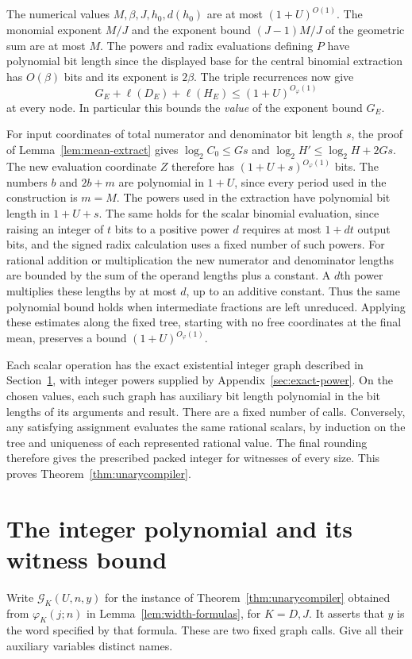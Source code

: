 \documentclass[11pt,letterpaper]{article}
\numberwithin{equation}{section}
\begin{document}
The numerical values $M,\beta,J,h_0,d(h_0)$ are at most $(1+U)^{O(1)}$. The monomial exponent $M/J$ and the exponent bound $(J-1)M/J$ of the geometric sum are at most $M$. The powers and radix evaluations defining $P$ have polynomial bit length since the displayed base for the central binomial extraction has $O(\beta)$ bits and its exponent is $2\beta$. The triple recurrences now give
\[
              G_E+\ell(D_E)+\ell(H_E)\le(1+U)^{O_\varphi(1)}
\]
at every node. In particular this bounds the \emph{value} of the exponent bound $G_E$.

For input coordinates of total numerator and denominator bit length $s$, the proof of Lemma~\ref{lem:mean-extract} gives $\log_2 C_0\le Gs$ and $\log_2 H'\le\log_2 H+2Gs$. The new evaluation coordinate $Z$ therefore has $(1+U+s)^{O_\varphi(1)}$ bits. The numbers $b$ and $2b+m$ are polynomial in $1+U$, since every period used in the construction is $m=M$. The powers used in the extraction have polynomial bit length in $1+U+s$. The same holds for the scalar binomial evaluation, since raising an integer of $t$ bits to a positive power $d$ requires at most $1+dt$ output bits, and the signed radix calculation uses a fixed number of such powers. For rational addition or multiplication the new numerator and denominator lengths are bounded by the sum of the operand lengths plus a constant. A $d$th power multiplies these lengths by at most $d$, up to an additive constant. Thus the same polynomial bound holds when intermediate fractions are left unreduced. Applying these estimates along the fixed tree, starting with no free coordinates at the final mean, preserves a bound $(1+U)^{O_\varphi(1)}$.

Each scalar operation has the exact existential integer graph described in Section~\ref{sec:arithmetic}, with integer powers supplied by Appendix~\ref{sec:exact-power}. On the chosen values, each such graph has auxiliary bit length polynomial in the bit lengths of its arguments and result. There are a fixed number of calls. Conversely, any satisfying assignment evaluates the same rational scalars, by induction on the tree and uniqueness of each represented rational value. The final rounding therefore gives the prescribed packed integer for witnesses of every size. This proves Theorem~\ref{thm:unarycompiler}.

\section{The integer polynomial and its witness bound}\label{sec:arithmetic}
Write $\mathcal G_K(U,n,y)$ for the instance of Theorem~\ref{thm:unarycompiler} obtained from $\varphi_K(j;n)$ in Lemma~\ref{lem:width-formulas}, for $K=D,J$. It asserts that $y$ is the word specified by that formula. These are two fixed graph calls. Give all their auxiliary variables distinct names.
\end{document}
